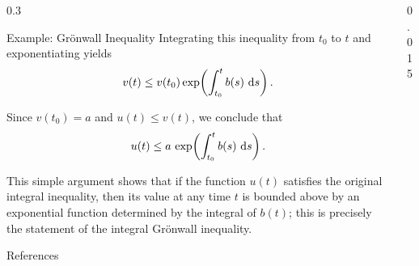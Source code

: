 \documentclass[final]{beamer}
\begin{document}
\begin{frame}[fragile]
\begin{columns}[t]
\begin{column}{0.3\paperwidth}
\begin{exampleblock}{Example: Grönwall Inequality}
    Integrating this inequality from \(t_0\) to \(t\) and exponentiating yields
    \[
        v(t) \le v(t_0) \exp\!\left(\int_{t_0}^t b(s)\, \dx[s]\right).
    \]

    Since \(v(t_0)=a\) and \(u(t) \le v(t)\), we conclude that
    \[
        u(t) \le a\, \exp\!\left(\int_{t_0}^t b(s)\, \dx[s]\right).
    \]

    This simple argument shows that if the function \(u(t)\) satisfies the original
    integral inequality, then its value at any time \(t\) is bounded above by an
    exponential function determined by the integral of \(b(t)\); this is precisely
    the statement of the integral Grönwall inequality.
\end{exampleblock}

\begin{alertblock}{References}
    \nocite{*}
    
    
\end{alertblock}

\end{column}

\begin{column}{0.015\paperwidth}\end{column}
\end{columns}
\end{frame}
\end{document}

